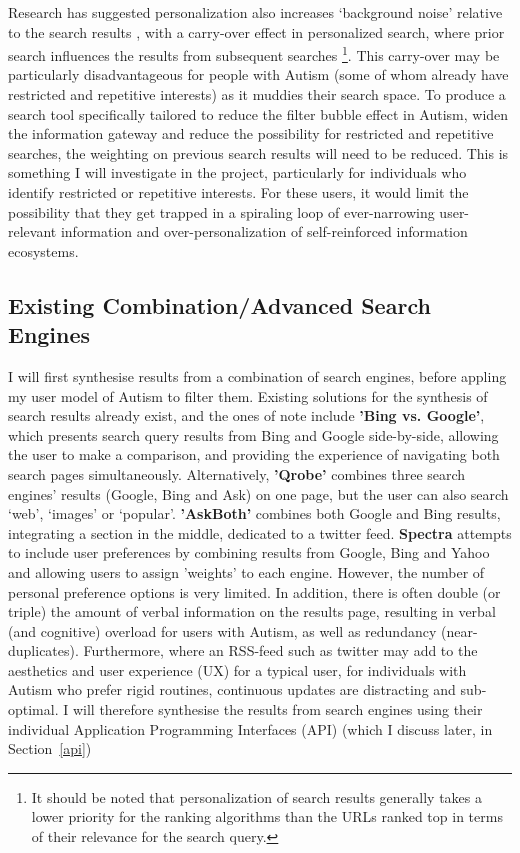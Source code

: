 \documentclass[a4paper, 10pt]{article}
\begin{document}
Research has suggested personalization also increases ‘background noise’ relative to the search results \cite{briggs}, with a carry-over effect in personalized search, where prior search influences the results from subsequent searches \footnote{It should be noted that personalization of search results generally takes a lower priority for the ranking algorithms than the URLs ranked top in terms of their relevance for the search query.}. This carry-over may be particularly disadvantageous for people with Autism (some of whom already have restricted and repetitive interests) as it muddies their search space. To produce a search tool specifically tailored to reduce the filter bubble effect in Autism, widen the information gateway and reduce the possibility for restricted and repetitive searches, the weighting on previous search results will need to be reduced. This is something I will investigate in the project, particularly for individuals who identify restricted or repetitive interests. For these users, it would limit the possibility that they get trapped in a spiraling loop of ever-narrowing user-relevant information and over-personalization of self-reinforced information ecosystems.


\subsection{Existing Combination/Advanced Search Engines}\label{Existing Combination/Advanced Search Engines}
I will first synthesise results from a combination of search engines, before appling my user model of Autism to filter them. Existing solutions for the synthesis of search results already exist, and the ones of note include \textbf{'Bing vs. Google'}, which presents search query results from Bing and Google side-by-side, allowing the user to make a comparison, and providing the experience of navigating both search pages simultaneously. Alternatively, \textbf{'Qrobe'} combines three search engines’ results (Google, Bing and Ask) on one page, but the user can also search ‘web’, ‘images’ or ‘popular’. \textbf{'AskBoth'} combines both Google and Bing results, integrating a section in the middle, dedicated to a twitter feed. \textbf{Spectra} attempts to include user preferences by combining results from Google, Bing and Yahoo and allowing users to assign 'weights' to each engine. However, the number of personal preference options is very limited. In addition, there is often double (or triple) the amount of verbal information on the results page, resulting in verbal (and cognitive) overload for users with Autism, as well as redundancy (near-duplicates). Furthermore, where an RSS-feed such as twitter may add to the aesthetics and user experience (UX) for a typical user, for individuals with Autism who prefer rigid routines, continuous updates are distracting and sub-optimal. I will therefore synthesise the results from search engines using their individual Application Programming Interfaces (API) (which I discuss later, in Section~\ref{api})
\end{document}
